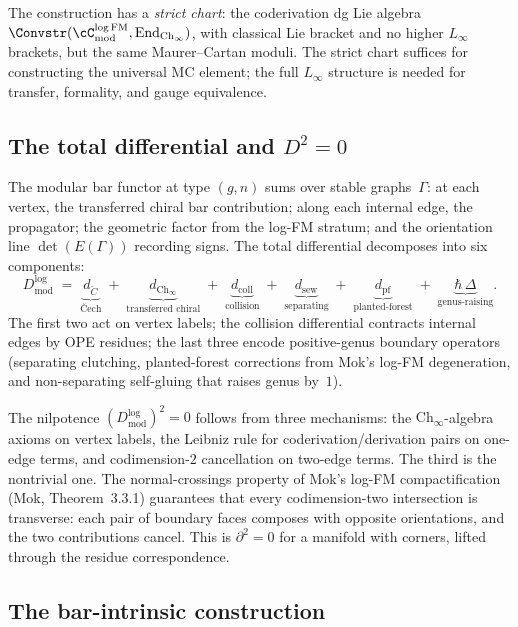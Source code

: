 The construction has a \emph{strict chart}: the coderivation dg Lie
algebra $\Convstr(\cC^{\log\mathrm{FM}}_{\mathrm{mod}},
\mathrm{End}_{\mathrm{Ch}_\infty})$, with classical Lie bracket and
no higher $L_\infty$ brackets, but the same Maurer--Cartan moduli.
The strict chart suffices for constructing the universal MC element;
the full $L_\infty$ structure is needed for transfer, formality,
and gauge equivalence.

\subsection*{The total differential and $D^2=0$}

The modular bar functor at type $(g,n)$ sums over stable
graphs~$\Gamma$: at each vertex, the transferred chiral
bar contribution; along each internal edge, the propagator;
the geometric factor from the log-FM stratum; and the orientation
line $\det(E(\Gamma))$ recording signs. The total differential
decomposes into six components:
\[
D^{\log}_{\mathrm{mod}}
\;=\;
\underbrace{d_{\check C}}_{\text{\v Cech}}
\;+\;
\underbrace{d_{\mathrm{Ch}_\infty}}_{\text{transferred chiral}}
\;+\;
\underbrace{d_{\mathrm{coll}}}_{\text{collision}}
\;+\;
\underbrace{d_{\mathrm{sew}}}_{\text{separating}}
\;+\;
\underbrace{d_{\mathrm{pf}}}_{\text{planted-forest}}
\;+\;
\underbrace{\hbar\,\Delta}_{\text{genus-raising}}.
\]
The first two act on vertex labels; the collision differential
contracts internal edges by OPE residues; the last three
encode positive-genus boundary operators (separating clutching,
planted-forest corrections from Mok's log-FM degeneration, and
non-separating self-gluing that raises genus by~$1$).

The nilpotence $(D^{\log}_{\mathrm{mod}})^2=0$ follows from three
mechanisms: the $\mathrm{Ch}_\infty$-algebra axioms on vertex labels,
the Leibniz rule for coderivation/derivation pairs on one-edge terms,
and codimension-$2$ cancellation on two-edge terms.
The third is the nontrivial one.
The normal-crossings property of Mok's log-FM compactification
(Mok, Theorem~3.3.1) guarantees that every codimension-two
intersection is transverse: each pair of boundary faces composes
with opposite orientations, and the two contributions cancel.
This is $\partial^2=0$ for a manifold with corners, lifted
through the residue correspondence.


\subsection*{The bar-intrinsic construction}


